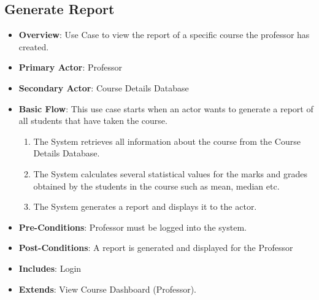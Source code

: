\documentclass[12pt, a4]{article}
\begin{document}
\subsection{Generate Report}
\begin{itemize}
    \item \textbf{Overview}: Use Case to view the report of a specific course the professor has created.
    \item \textbf{Primary Actor}: Professor
    \item \textbf{Secondary Actor}: Course Details Database
    \item \textbf{Basic Flow}: This use case starts when an actor wants to generate a report of all students that have taken the course.
        \begin{enumerate}
            \item The System retrieves all information about the course from the Course Details Database.
            \item The System calculates several statistical values for the marks and grades obtained by the students in the course such as mean, median etc.
            \item The System generates a report and displays it to the actor.
        \end{enumerate}
    \item \textbf{Pre-Conditions}: Professor must be logged into the system.
    \item \textbf{Post-Conditions}: A report is generated and displayed for the Professor
    \item \textbf{Includes}: Login
    \item \textbf{Extends}: View Course Dashboard (Professor).
\end{itemize}

\end{document}
